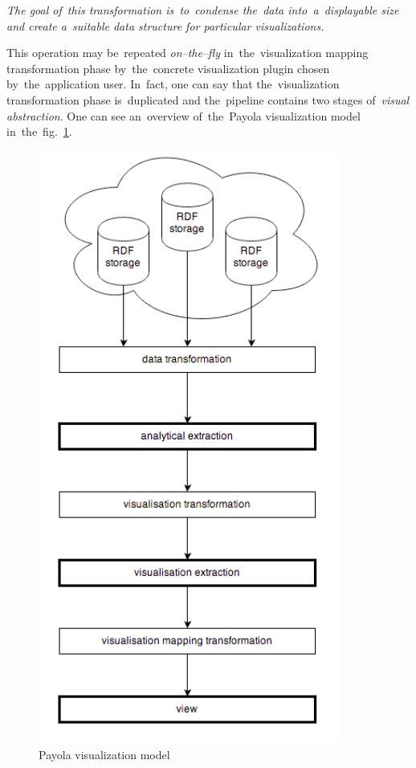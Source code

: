 \emph{The goal of~this transformation is~to~condense the~data into~a~displayable size and create
a~suitable data structure for particular visualizations.}

This operation may be~repeated \emph{on--the--fly} in~the~visualization mapping transformation
phase by~the~concrete visualization plugin chosen by~the~application user. In~fact, one can
say that the~visualization transformation phase is~duplicated and the~pipeline contains two
stages of~\emph{visual abstraction}. One can see an~overview of~the~Payola 
visualization model in~the~fig.~\ref{fig:payola_model}.

\begin{figure}
	\centering
	\includegraphics[width=100mm]{img/payola_model.png}
	\caption{Payola visualization model}
	\label{fig:payola_model}
\end{figure}

